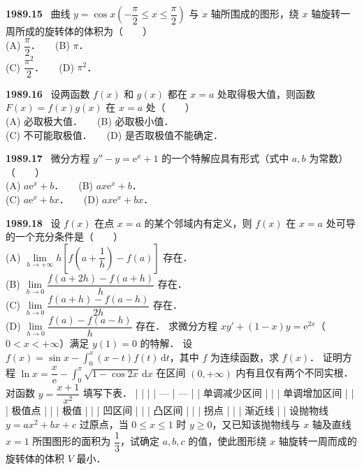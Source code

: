 \documentclass[UTF8,12pt]{ctexart}
\newcommand{\qn}[1]{\textbf{\large #1}\ }
\begin{document}
\vfill
\newpage
\qn{1989.15}
曲线 $y=\cos x\left(-\dfrac{\pi}{2}\leqslant x\leqslant\dfrac{\pi}{2}\right)$ 与 $x$ 轴所围成的图形，绕 $x$ 轴旋转一周所成的旋转体的体积为（　　）
\\
\noindent (A) $\dfrac{\pi}{2}$．　　(B) $\pi$．
\\
\noindent (C) $\dfrac{\pi^2}{2}$．　　(D) $\pi^2$．

\vfill
\newpage
\qn{1989.16}
设两函数 $f(x)$ 和 $g(x)$ 都在 $x=a$ 处取得极大值，则函数 $F(x)=f(x)g(x)$ 在 $x=a$ 处（　　）
\\
\noindent (A) 必取极大值．　　(B) 必取极小值．
\\
\noindent (C) 不可能取极值．　　(D) 是否取极值不能确定．

\vfill
\newpage
\qn{1989.17}
微分方程 $y''-y=\mathrm{e}^x+1$ 的一个特解应具有形式（式中 $a,b$ 为常数）（　　）
\\
\noindent (A) $a\mathrm{e}^x+b$．　　(B) $ax\mathrm{e}^x+b$．
\\
\noindent (C) $a\mathrm{e}^x+bx$．　　(D) $ax\mathrm{e}^x+bx$．

\vfill
\newpage
\qn{1989.18}
设 $f(x)$ 在点 $x=a$ 的某个邻域内有定义，则 $f(x)$ 在 $x=a$ 处可导的一个充分条件是（　　）
\\
\noindent (A) $\lim\limits_{h\to+\infty}h\left[f\left(a+\dfrac{1}{h}\right)-f(a)\right]$ 存在．
\\
\noindent (B) $\lim\limits_{h\to0}\dfrac{f(a+2h)-f(a+h)}{h}$ 存在．
\\
\noindent (C) $\lim\limits_{h\to0}\dfrac{f(a+h)-f(a-h)}{2h}$ 存在．
\\
\noindent (D) $\lim\limits_{h\to0}\dfrac{f(a)-f(a-h)}{h}$ 存在．
求微分方程 $xy'+(1-x)y=\mathrm{e}^{2x}$（$0<x<+\infty$）满足 $y(1)=0$ 的特解．
设 $f(x)=\sin x-\int_0^x(x-t)f(t)\,\mathrm{d}t$，其中 $f$ 为连续函数，求 $f(x)$．
证明方程 $\ln x=\dfrac{x}{\mathrm{e}}-\int_0^\pi\sqrt{1-\cos 2x}\,\mathrm{d}x$ 在区间 $(0,+\infty)$ 内有且仅有两个不同实根．
对函数 $y=\dfrac{x+1}{x^2}$ 填写下表．
|  |  |
| --- | --- |
| 单调减少区间 |  |
| 单调增加区间 |  |
| 极值点 |  |
| 极值 |  |
| 凹区间 |  |
| 凸区间 |  |
| 拐点 |  |
| 渐近线 |  |
设抛物线 $y=ax^2+bx+c$ 过原点，当 $0\leqslant x\leqslant1$ 时 $y\geqslant0$，又已知该抛物线与 $x$ 轴及直线 $x=1$ 所围图形的面积为 $\dfrac{1}{3}$，试确定 $a,b,c$ 的值，使此图形绕 $x$ 轴旋转一周而成的旋转体的体积 $V$ 最小．

\vfill
\newpage
\end{document}
